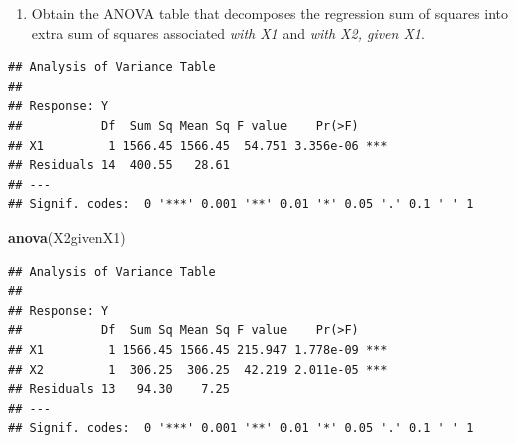\documentclass[
]{article}
\newenvironment{Shaded}{\begin{snugshade}}{\end{snugshade}}
\newcommand{\CommentTok}[1]{\textcolor[rgb]{0.56,0.35,0.01}{\textit{#1}}}
\newcommand{\DataTypeTok}[1]{\textcolor[rgb]{0.13,0.29,0.53}{#1}}
\newcommand{\KeywordTok}[1]{\textcolor[rgb]{0.13,0.29,0.53}{\textbf{#1}}}
\newcommand{\NormalTok}[1]{#1}
\newcommand{\OperatorTok}[1]{\textcolor[rgb]{0.81,0.36,0.00}{\textbf{#1}}}
\newcommand{\StringTok}[1]{\textcolor[rgb]{0.31,0.60,0.02}{#1}}
\providecommand{\tightlist}{%
  \setlength{\itemsep}{0pt}\setlength{\parskip}{0pt}}
\begin{document}
\begin{enumerate}
\def\labelenumi{(\alph{enumi})}
\tightlist
\item
  Obtain the ANOVA table that decomposes the regression sum of squares
  into extra sum of squares associated \emph{with X1} and \emph{with X2,
  given X1}.
\end{enumerate}

\begin{Shaded}
\end{Shaded}

\begin{verbatim}
## Analysis of Variance Table
## 
## Response: Y
##           Df  Sum Sq Mean Sq F value    Pr(>F)    
## X1         1 1566.45 1566.45  54.751 3.356e-06 ***
## Residuals 14  400.55   28.61                      
## ---
## Signif. codes:  0 '***' 0.001 '**' 0.01 '*' 0.05 '.' 0.1 ' ' 1
\end{verbatim}

\begin{Shaded}
\begin{Highlighting}[]
\KeywordTok{anova}\NormalTok{(X2givenX1)}
\end{Highlighting}
\end{Shaded}

\begin{verbatim}
## Analysis of Variance Table
## 
## Response: Y
##           Df  Sum Sq Mean Sq F value    Pr(>F)    
## X1         1 1566.45 1566.45 215.947 1.778e-09 ***
## X2         1  306.25  306.25  42.219 2.011e-05 ***
## Residuals 13   94.30    7.25                      
## ---
## Signif. codes:  0 '***' 0.001 '**' 0.01 '*' 0.05 '.' 0.1 ' ' 1
\end{verbatim}
\end{document}
